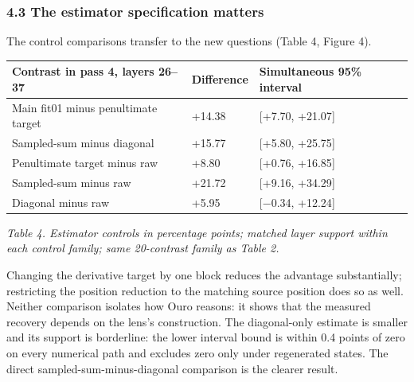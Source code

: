 \documentclass[
  british,
  11pt,
  a4paper,
]{article}
\newcounter{none} %
\begin{document}
\subsubsection{4.3 The estimator specification
matters}\label{the-estimator-specification-matters}

The control comparisons transfer to the new questions (Table 4, Figure
4).

{\def\LTcaptype{none} %
\begin{longtable}[]{@{}
  >{\raggedright\arraybackslash}p{}
  >{\raggedleft\arraybackslash}p{}
  >{\raggedright\arraybackslash}p{}@{}}
\toprule\noalign{}
\begin{minipage}[b]{\linewidth}\raggedright
Contrast in pass 4, layers 26--37
\end{minipage} & \begin{minipage}[b]{\linewidth}\raggedleft
Difference
\end{minipage} & \begin{minipage}[b]{\linewidth}\raggedright
Simultaneous 95\% interval
\end{minipage} \\
\midrule\noalign{}
\endhead
\bottomrule\noalign{}
\endlastfoot
Main fit01 minus penultimate target & +14.38 & {[}+7.70, +21.07{]} \\
Sampled-sum minus diagonal & +15.77 & {[}+5.80, +25.75{]} \\
Penultimate target minus raw & +8.80 & {[}+0.76, +16.85{]} \\
Sampled-sum minus raw & +21.72 & {[}+9.16, +34.29{]} \\
Diagonal minus raw & +5.95 & {[}−0.34, +12.24{]} \\
\end{longtable}
}

\emph{Table 4. Estimator controls in percentage points; matched layer
support within each control family; same 20-contrast family as Table 2.}

Changing the derivative target by one block reduces the advantage
substantially; restricting the position reduction to the matching source
position does so as well. Neither comparison isolates how Ouro reasons:
it shows that the measured recovery depends on the lens's construction.
The diagonal-only estimate is smaller and its support is borderline: the
lower interval bound is within 0.4 points of zero on every numerical
path and excludes zero only under regenerated states. The direct
sampled-sum-minus-diagonal comparison is the clearer result.
\end{document}
